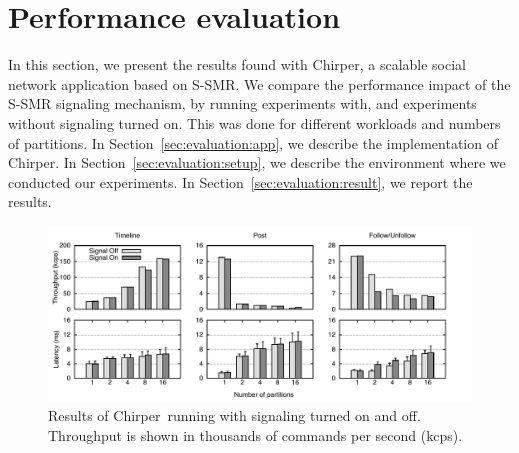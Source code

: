 \documentclass[11pt]{article}
\newcommand{\ppm}{\mathcal{P}}
\newcommand{\ssmr}{\mbox{S-SMR}}
\newcommand{\appname}{Chirper} %
\begin{document}


\section{Performance evaluation}
In this section, we present the results found with \appname{}, a scalable social network application based on \ssmr{}.
We compare the performance impact of the \ssmr{} signaling mechanism, by running experiments with, and experiments without signaling turned on.
This was done for different workloads and numbers of partitions.
In Section~\ref{sec:evaluation:app}, we describe the implementation of \appname{}.
In Section~\ref{sec:evaluation:setup}, we describe the environment where we conducted our experiments.
In Section~\ref{sec:evaluation:result}, we report the results.

\begin{figure}
\begin{minipage}[b]{1\linewidth} %
\centering
      \includegraphics[width=1\linewidth]{figures/sc-at-scale-balance}
\end{minipage}
\caption{Results of \appname\ running with signaling turned on and off. Throughput is shown in thousands of commands per second (kcps).}
\label{fig:perf}
\end{figure}
\end{document}
